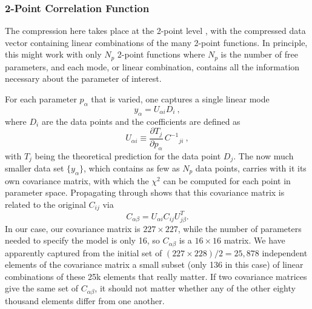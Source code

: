 \documentclass[twocolumn]{\docclass}
\newcommand\be{\begin{equation}}
\newcommand\ee{\end{equation}}
\def\bea{\begin{eqnarray}}
\def\eea{\end{eqnarray}}
\def\svs{\nonumber\\}
\begin{document}
	
	\subsubsection{2-Point Correlation Function}
	
	The compression here  takes place at the 2-point level \citep{Zablocki:2015zcm}, with the compressed data vector containing linear combinations of the many 2-point functions. In principle, this might work with only $N_p$ 2-point functions where $N_p$ is the number of free parameters, and each mode, or linear combination, contains all the information necessary about the parameter of interest. 
	
	For each parameter $p_\alpha$ that is varied, one captures a single linear mode
	\be
	y_\alpha = U_{\alpha i} D_i\
	,\ee
	where $D_i$ are the data points and the coefficients are defined as
	\be \label{eq:compression_scheme}
	U_{\alpha i} \equiv \frac{\partial T_j}{\partial p_\alpha} \, C^{-1}{}_{ji}\
	,\ee
	with $T_j$ being the theoretical prediction for the data point $D_j$.
	The now much smaller data set $\{y_\alpha\}$, which contains as few as $N_p$ data points, carries with it its own covariance matrix, with which the $\chi^2$ can be computed for each point in parameter space. Propagating through shows that this covariance matrix is related to the original $C_{ij}$ via
	\be
	C_{\alpha\beta} = U_{\alpha i} C_{ij} U^T_{j\beta}.
	\ee
	In our case, our covariance matrix is  $227 \times 227$, while the number of parameters needed to specify the model is only 16, so $C_{\alpha\beta}$ is a $16\times 16$ matrix. We have apparently captured from the initial set of $(227 \times 228)/2 = 25,878$ independent elements of the covariance matrix a small subset (only 136 in this case) of linear combinations of these 25k elements that really matter. If two covariance matrices give the same set of $C_{\alpha\beta}$, it should not matter whether any of the other eighty thousand elements differ from one another.
	
\end{document}
